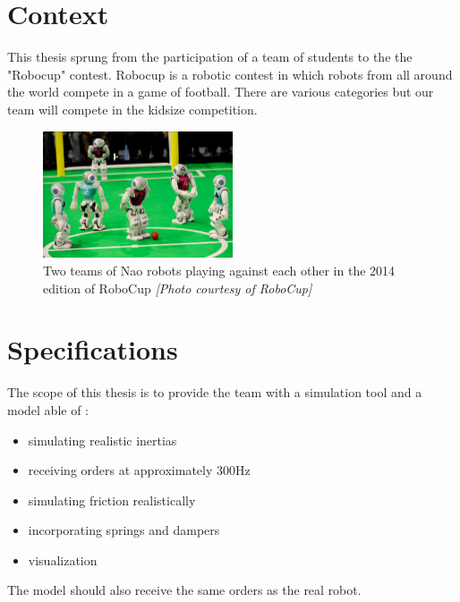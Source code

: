\section{Context}
This thesis sprung from the participation of a team of students to the the "Robocup" contest. Robocup is a robotic contest in which robots from all around the world compete in a game of football. There are various categories but our team will compete in the kidsize competition.

\begin{figure}[htp]
\center
\includegraphics[width=0.5\textwidth]{figures/robocup}
\caption[Two teams of Nao robots playing against each other]{Two teams of Nao robots playing against each other in the 2014 edition of RoboCup \textit{[Photo courtesy of RoboCup]}}
\label{fig:intro_robocup}
\end{figure}

\section{Specifications}
The scope of this thesis is to provide the team with a simulation tool and a model able of :
\begin{itemize}
\item simulating realistic inertias
\item receiving orders at approximately 300Hz
\item simulating friction realistically
\item incorporating springs and dampers
\item visualization
\end{itemize}

The model should also receive the same orders as the real robot.
